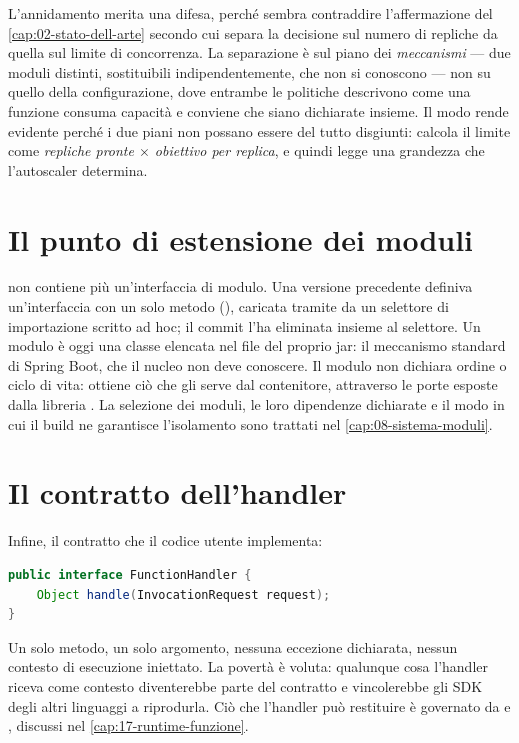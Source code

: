 L'annidamento merita una difesa, perch\'e sembra contraddire l'affermazione del
\cref{cap:02-stato-dell-arte} secondo cui \nf{} separa la decisione sul numero di
repliche da quella sul limite di concorrenza. La separazione \`e sul piano dei
\emph{meccanismi} --- due moduli distinti, sostituibili indipendentemente, che
non si conoscono --- non su quello della configurazione, dove entrambe le
politiche descrivono come una funzione consuma capacit\`a e conviene che siano
dichiarate insieme. Il modo  rende evidente perch\'e i due
piani non possano essere del tutto disgiunti: calcola il limite come
\emph{repliche pronte $\times$ obiettivo per replica}, e quindi legge una
grandezza che l'autoscaler determina.

\section{Il punto di estensione dei moduli}

 non contiene pi\`u un'interfaccia di modulo. Una versione
precedente definiva un'interfaccia  con un solo metodo
(), caricata tramite  da un
selettore di importazione scritto ad hoc; il commit  l'ha
eliminata insieme al selettore. Un modulo \`e oggi una classe
 elencata nel file
del proprio jar: il meccanismo standard di Spring Boot, che il nucleo non deve
conoscere. Il modulo non dichiara ordine o ciclo di vita: ottiene ci\`o che gli
serve dal contenitore, attraverso le porte esposte dalla libreria
. La selezione dei moduli, le loro dipendenze
dichiarate e il modo in cui il build ne garantisce l'isolamento sono trattati
nel \cref{cap:08-sistema-moduli}.

\section{Il contratto dell'handler}

Infine, il contratto che il codice utente implementa:

\begin{lstlisting}[language=Java]
public interface FunctionHandler {
    Object handle(InvocationRequest request);
}
\end{lstlisting}

Un solo metodo, un solo argomento, nessuna eccezione dichiarata, nessun contesto
di esecuzione iniettato. La povert\`a \`e voluta: qualunque cosa l'handler
riceva come contesto diventerebbe parte del contratto e vincolerebbe gli SDK
degli altri linguaggi a riprodurla. Ci\`o che l'handler pu\`o restituire \`e
governato da  e , discussi nel
\cref{cap:17-runtime-funzione}.

